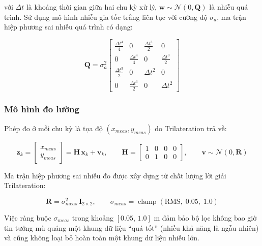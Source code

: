 với $\Delta t$ là khoảng thời gian giữa hai chu kỳ xử lý, $\mathbf{w} \sim \mathcal{N}(0, \mathbf{Q})$ là nhiễu quá trình. Sử dụng mô hình nhiễu gia tốc trắng liên tục với cường độ $\sigma_a$, ma trận hiệp phương sai nhiễu quá trình có dạng:

\begin{equation}
    \mathbf{Q} = \sigma_a^2
    \begin{bmatrix}
        \tfrac{\Delta t^4}{4} & 0 & \tfrac{\Delta t^3}{2} & 0 \\[0.3em]
        0 & \tfrac{\Delta t^4}{4} & 0 & \tfrac{\Delta t^3}{2} \\[0.3em]
        \tfrac{\Delta t^3}{2} & 0 & \Delta t^2 & 0 \\[0.3em]
        0 & \tfrac{\Delta t^3}{2} & 0 & \Delta t^2
    \end{bmatrix}
\end{equation}

\subsubsection{Mô hình đo lường}

Phép đo ở mỗi chu kỳ là tọa độ $(x_{meas}, y_{meas})$ do Trilateration trả về:

\begin{equation}
    \mathbf{z}_k = \begin{bmatrix} x_{meas} \\ y_{meas} \end{bmatrix} = \mathbf{H}\, \mathbf{x}_k + \mathbf{v}_k, \qquad
    \mathbf{H} = \begin{bmatrix} 1 & 0 & 0 & 0 \\ 0 & 1 & 0 & 0 \end{bmatrix}, \qquad \mathbf{v} \sim \mathcal{N}(0, \mathbf{R})
\end{equation}

Ma trận hiệp phương sai nhiễu đo được xây dựng từ chất lượng lời giải Trilateration:

\begin{equation}
    \mathbf{R} = \sigma_{meas}^2 \, \mathbf{I}_{2\times 2}, \qquad
    \sigma_{meas} = \operatorname{clamp}(\text{RMS},\; 0.05,\; 1.0)
\end{equation}

Việc ràng buộc $\sigma_{meas}$ trong khoảng $[0.05,\,1.0]$ m đảm bảo bộ lọc không bao giờ tin tưởng mù quáng một khung dữ liệu ``quá tốt'' (nhiều khả năng là ngẫu nhiên) và cũng không loại bỏ hoàn toàn một khung dữ liệu nhiễu lớn.

